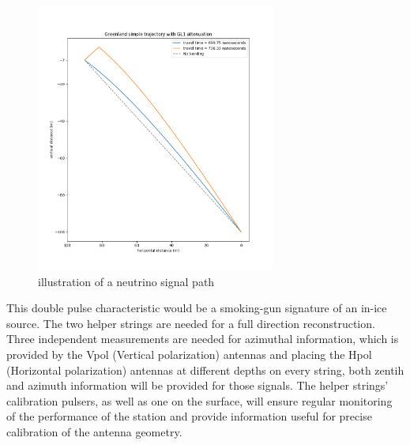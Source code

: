 \documentclass[11pt,a4paper,faculty=we,language=en,doctype=report]{cls/ugent-doc}
\begin{document}
\begin{figure}[ht]
	\centering
	\includegraphics[width=0.7\textwidth]{figures/path_illustration.png}	
	\caption{illustration of a neutrino signal path}
	\label{fig:path_illustration}
\end{figure}


This double pulse characteristic would be a smoking-gun signature of an in-ice source. The two helper strings are needed for a full direction reconstruction. Three independent measurements are needed for azimuthal information, which is provided by the Vpol (Vertical polarization) antennas and placing the Hpol (Horizontal polarization) antennas at different depths on every string, both zentih and azimuth information will be provided for those signals. The helper strings' calibration pulsers, as well as one on the surface, will ensure regular monitoring of the performance of the station and provide information useful for precise calibration of the antenna geometry.
\end{document}
